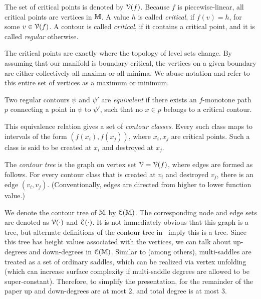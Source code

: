 The set of critical points is denoted by ${\cal V}(f)$.
Because $f$ is piecewise-linear, all critical points are vertices in $\mathbb{M}$. 
A value $h$ is called \emph{critical}, if $f(v) = h$, for some $v \in {\cal V}(f)$. 
A contour is called \emph{critical}, if it contains a critical point, and it is called \emph{regular} otherwise.

The critical points are exactly where the topology of level sets change.
By assuming that our manifold is boundary critical, the vertices on a given boundary are either collectively all maxima or all minima.  
We abuse notation and refer to this entire set of vertices as a maximum or minimum.


\begin{definition} \label{def:equiv} Two regular contours $\psi$ and $\psi'$ are \emph{equivalent} 
if there exists an $f$-monotone path $p$ connecting a point in $\psi$ to $\psi'$,
such that no $x \in p$ belongs to a critical contour.
\end{definition}

This equivalence relation gives a set of \emph{contour classes}. 
Every such class maps to intervals
of the form $(f(x_i),f(x_j))$, where $x_i, x_j$ are critical points. Such a class is said
to be created at $x_i$ and destroyed at $x_j$. 

\begin{definition} \label{def:tree} The \emph{contour tree} is the graph on vertex set ${\cal V}= {\cal V}(f)$, where
edges are formed as follows. For every contour class that is created at $v_i$ and destroyed $v_j$,
there is an edge $(v_i,v_j)$. (Conventionally, edges are directed from higher to lower function value.)
\end{definition}

We denote the contour tree of $\mathbb{M}$
by ${\cal C}(\mathbb{M})$. The corresponding node and edge sets are denoted as ${\cal V}(\cdot)$ and ${\cal E}(\cdot)$.
It is not immediately obvious that this graph is a tree, but alternate definitions of the contour tree
in~\cite{csa-cctad-00} imply this is a tree. 
Since this tree has height values associated with the vertices, we can talk about up-degrees and down-degrees in ${\cal C}(\mathbb{M})$.
%
Similar to \cite{kobps-ctsssit-97} (among others), multi-saddles are treated as a set of ordinary saddles, which can be realized 
via vertex unfolding (which can increase surface complexity if multi-saddle degrees are allowed to be super-constant).
Therefore, to simplify the presentation, for the remainder of the paper up and down-degrees are at most $2$, and total degree is at most $3$.
%


